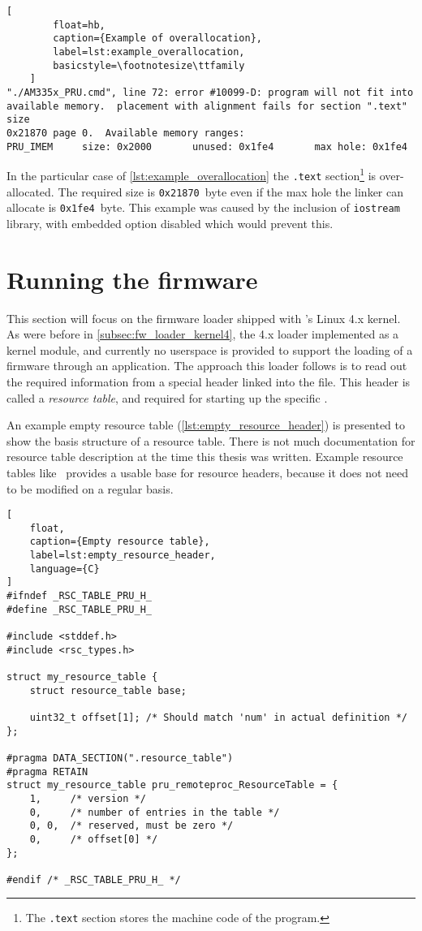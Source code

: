 \begin{lstlisting}[
		float=hb,
		caption={Example of overallocation},
		label=lst:example_overallocation,
		basicstyle=\footnotesize\ttfamily
	]
"./AM335x_PRU.cmd", line 72: error #10099-D: program will not fit into
available memory.  placement with alignment fails for section ".text" size
0x21870 page 0.  Available memory ranges:
PRU_IMEM     size: 0x2000       unused: 0x1fe4       max hole: 0x1fe4
\end{lstlisting}

In the particular case of \cref{lst:example_overallocation} the \verb|.text| section\footnote{The \verb|.text| section stores the machine code of the program.} is over-allocated. The required size is \verb|0x21870|\ byte even if the max hole the linker can allocate is \verb|0x1fe4|\ byte. This example was caused by the inclusion of \verb|iostream| library, with embedded \cpp{} option disabled which would prevent this.

\section{Running the firmware}

This section will focus on the firmware loader shipped with \ti{}'s Linux 4.x kernel. As were before in \cref{subsec:fw_loader_kernel4}, the 4.x loader implemented as a kernel module, and currently no userspace \api{} is provided to support the loading of a \pru{} firmware through an application. The approach this loader follows is to read out the required information from a special header linked into the \elf{} file. This header is called a \emph{resource table}, and required for starting up the specific \pru{}.

An example empty resource table (\cref{lst:empty_resource_header}) is presented to show the basis structure of a resource table. There is not much documentation for resource table description at the time this thesis was written. Example resource tables like~\cite{RESOURCE_TABLE_0}\cite{RESOURCE_TABLE_1} provides a usable base for resource headers, because it does not need to be modified on a regular basis.

\begin{lstlisting}[
	float,
	caption={Empty resource table},
	label=lst:empty_resource_header,
	language={C}
]
#ifndef _RSC_TABLE_PRU_H_
#define _RSC_TABLE_PRU_H_

#include <stddef.h>
#include <rsc_types.h>

struct my_resource_table {
	struct resource_table base;

	uint32_t offset[1]; /* Should match 'num' in actual definition */
};

#pragma DATA_SECTION(".resource_table")
#pragma RETAIN
struct my_resource_table pru_remoteproc_ResourceTable = {
	1,     /* version */
	0,     /* number of entries in the table */
	0, 0,  /* reserved, must be zero */
	0,     /* offset[0] */
};

#endif /* _RSC_TABLE_PRU_H_ */
\end{lstlisting}


